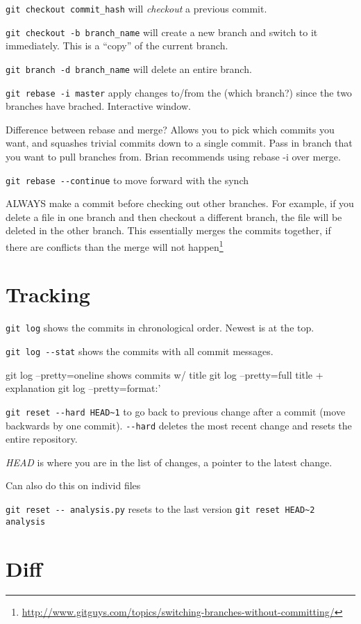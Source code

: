 \documentclass[iop,floatfix]{emulateapj}
\begin{document}
\verb|git checkout commit_hash| will \emph{checkout} a previous commit.

\verb|git checkout -b branch_name| will create a new branch and switch to it
immediately. This is a ``copy'' of the current branch.

\verb|git branch -d branch_name| will delete an entire branch.

\verb|git rebase -i master| apply changes to/from the (which branch?) since the two branches have brached. Interactive window.

Difference between rebase and merge? Allows you to pick which commits you want, and squashes trivial commits down to a single commit. Pass in branch that you want to pull branches from. Brian recommends using rebase -i over merge.

\verb|git rebase --continue| to move forward with the synch

ALWAYS make a commit before checking out other branches. For example, if you delete a file in one branch and then checkout a different branch, the file will be deleted in the other branch. This essentially merges the commits together, if there are conflicts than the merge will not happen\footnote{\url{http://www.gitguys.com/topics/switching-branches-without-committing/}}

\section{Tracking}

\verb|git log| shows the commits in chronological order. Newest is at the top.

\verb|git log --stat| shows the commits with all commit messages.

git log --pretty=oneline shows commits w/ title
git log --pretty=full title + explanation
git log --pretty=format:'%

\verb|git reset --hard HEAD~1| to go back to previous change after a commit (move backwards by one commit). \verb|--hard| deletes the most recent change and resets the entire repository.



\emph{HEAD} is where you are in the list of changes, a pointer to the latest change.

Can also do this on individ files

\verb|git reset -- analysis.py| resets to the last version
\verb|git reset HEAD~2 analysis|

\section{Diff}
\end{document}
